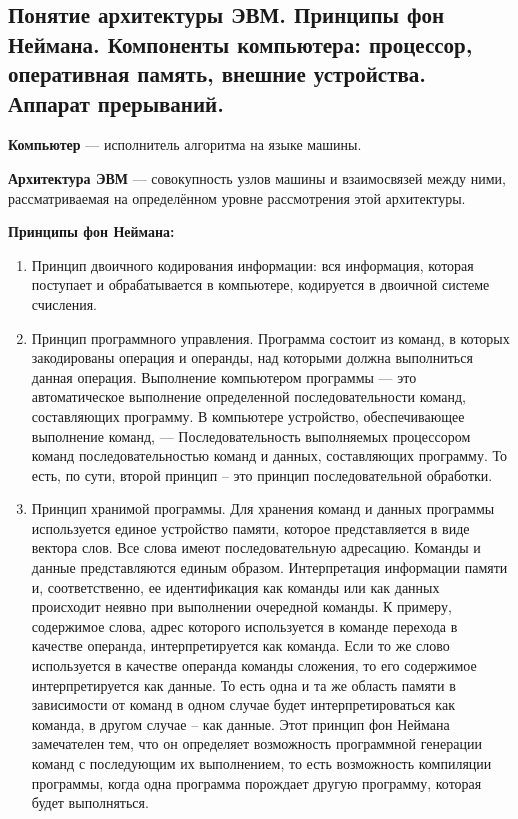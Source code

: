 \subsection{Понятие архитектуры ЭВМ. Принципы фон Неймана. Компоненты компьютера: процессор, оперативная память, внешние устройства. Аппарат прерываний.}


\textbf{Компьютер} --- исполнитель алгоритма на языке машины.

\textbf{Архитектура ЭВМ} --- совокупность узлов машины и взаимосвязей между ними, рассматриваемая на определённом уровне рассмотрения этой архитектуры.

\textbf{Принципы фон Неймана:}
\begin{enumerate}
    \item Принцип двоичного кодирования информации: вся информация, которая поступает и обрабатывается в компьютере, кодируется в двоичной системе счисления.
    \item Принцип программного управления. Программа состоит из команд, в которых закодированы операция и операнды, над которыми должна выполниться данная операция. Выполнение компьютером программы — это автоматическое выполнение определенной последовательности команд, составляющих программу. В компьютере устройство, обеспечивающее выполнение команд, — Последовательность выполняемых процессором команд последовательностью команд и данных, составляющих программу. То есть, по сути, второй принцип – это принцип последовательной обработки.
    \item Принцип хранимой программы. Для хранения команд и данных программы используется единое устройство памяти, которое представляется в виде вектора слов. Все слова имеют последовательную адресацию. Команды и данные представляются единым образом. Интерпретация информации памяти и, соответственно, ее идентификация как команды или как данных происходит неявно при выполнении очередной команды. К примеру, содержимое слова, адрес которого используется в команде перехода в качестве операнда, интерпретируется как команда. Если то же слово используется в качестве операнда команды сложения, то его содержимое интерпретируется как данные. То есть одна и та же область памяти в зависимости от команд в одном случае будет интерпретироваться как команда, в другом случае – как данные. Этот принцип фон Неймана замечателен тем, что он определяет возможность программной генерации команд с последующим их выполнением, то есть возможность компиляции программы, когда одна программа порождает другую программу, которая будет выполняться.
\end{enumerate}

